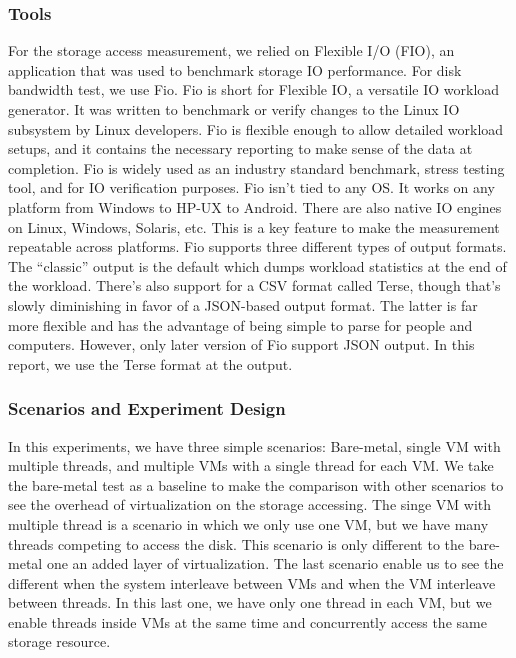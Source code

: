 \documentclass{acmsig}
\begin{document}
\subsubsection{Tools}
For the storage access measurement, we relied on Flexible I/O (FIO), an application that was used to benchmark storage IO performance. For disk bandwidth test, we use Fio. Fio is short for Flexible IO, a versatile IO workload generator. It was written to benchmark or verify changes to the Linux IO subsystem by Linux developers. Fio is flexible enough to allow detailed workload setups, and it contains the necessary reporting to make sense of the data at completion. Fio is widely used as an industry standard benchmark, stress testing tool, and for IO verification purposes. Fio isn't tied to any OS. It works on any platform from Windows to HP-UX to Android. There are also native IO engines on Linux, Windows, Solaris, etc. This is a key feature to make the measurement repeatable across platforms.
Fio supports three different types of output formats. The “classic” output is the default which dumps workload statistics at the end of the workload. There's also support for a CSV format called Terse, though that's slowly diminishing in favor of a JSON-based output format. The latter is far more flexible and has the advantage of being simple to parse for people and computers. However, only later version of Fio support JSON output. In this report, we use the Terse format at the output.

\subsubsection{Scenarios and Experiment Design}

In this experiments, we have three simple scenarios: Bare-metal, single VM with multiple threads, and multiple VMs with a single thread for each VM. We take the bare-metal test as a baseline to make the comparison with other scenarios to see the overhead of virtualization on the storage accessing. The singe VM with multiple thread is a scenario in which we only use one VM, but we have many threads competing to access the disk. This scenario is only different to the bare-metal one an added layer of virtualization. The last scenario enable us to see the different when the system interleave between VMs and when the VM interleave between threads. In this last one, we have only one thread in each VM, but we enable threads inside VMs at the same time and concurrently access the same storage resource.
\end{document}
